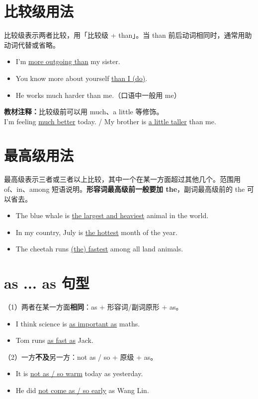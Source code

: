 \documentclass[11pt,a4paper]{ctexart}
\begin{document}
\section{比较级用法}
比较级表示两者比较，用「比较级 + than」。当 than 前后动词相同时，通常用助动词代替或省略。
\begin{itemize}[leftmargin=1.4em]
\item I'm \underline{more outgoing than} my sister.
\item You know more about yourself \underline{than I (do)}.
\item He works much harder than me.（口语中一般用 me）
\end{itemize}
\textbf{教材注释：}比较级前可以用 much、a little 等修饰。\\
\quad I'm feeling \underline{much better} today. / My brother is \underline{a little taller} than me.

\section{最高级用法}
最高级表示三者或三者以上比较，其中一个在某一方面超过其他几个。范围用 of、in、among 短语说明。\textbf{形容词最高级前一般要加 the}，副词最高级前的 the 可以省去。
\begin{itemize}[leftmargin=1.4em]
\item The blue whale is \underline{the largest and heaviest} animal in the world.
\item In my country, July is \underline{the hottest} month of the year.
\item The cheetah runs \underline{(the) fastest} among all land animals.
\end{itemize}

\section{as ... as 句型}
（1）两者在某一方面\textbf{相同}：as + 形容词/副词原形 + as。
\begin{itemize}[leftmargin=1.4em]
\item I think science is \underline{as important as} maths.
\item Tom runs \underline{as fast as} Jack.
\end{itemize}
（2）一方\textbf{不及}另一方：not as / so + 原级 + as。
\begin{itemize}[leftmargin=1.4em]
\item It is \underline{not as / so warm} today as yesterday.
\item He did \underline{not come as / so early} as Wang Lin.
\end{itemize}
\end{document}
